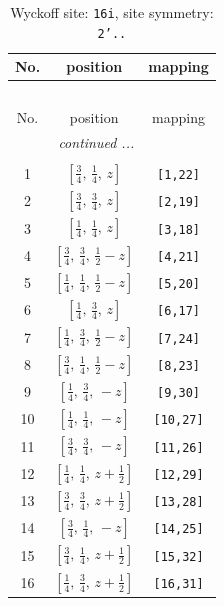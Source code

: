 \documentclass[fleqn,8pt]{jsarticle}
\begin{document}
\begin{longtable}{ccc}
\caption{Wyckoff site: {\tt 16i}, site symmetry: {\tt 2'..}}
 \\
 \hline \hline
No. & position & mapping \\ \hline \endfirsthead

\multicolumn{2}{l}{\tablename\ \thetable{}} \\
 \hline \hline
No. & position & mapping \\ \hline \endhead

 \hline \hline
\multicolumn{2}{r}{\footnotesize\it continued ...} \\ \endfoot

 \hline \hline
\multicolumn{2}{r}{} \\ \endlastfoot

1 & $\left[ \frac{3}{4},\, \frac{1}{4},\, z \right]$ & {\tt [1,22]} \\ \hline
2 & $\left[ \frac{3}{4},\, \frac{3}{4},\, z \right]$ & {\tt [2,19]} \\ \hline
3 & $\left[ \frac{1}{4},\, \frac{1}{4},\, z \right]$ & {\tt [3,18]} \\ \hline
4 & $\left[ \frac{3}{4},\, \frac{3}{4},\, \frac{1}{2} - z \right]$ & {\tt [4,21]} \\ \hline
5 & $\left[ \frac{1}{4},\, \frac{1}{4},\, \frac{1}{2} - z \right]$ & {\tt [5,20]} \\ \hline
6 & $\left[ \frac{1}{4},\, \frac{3}{4},\, z \right]$ & {\tt [6,17]} \\ \hline
7 & $\left[ \frac{1}{4},\, \frac{3}{4},\, \frac{1}{2} - z \right]$ & {\tt [7,24]} \\ \hline
8 & $\left[ \frac{3}{4},\, \frac{1}{4},\, \frac{1}{2} - z \right]$ & {\tt [8,23]} \\ \hline
9 & $\left[ \frac{1}{4},\, \frac{3}{4},\, - z \right]$ & {\tt [9,30]} \\ \hline
10 & $\left[ \frac{1}{4},\, \frac{1}{4},\, - z \right]$ & {\tt [10,27]} \\ \hline
11 & $\left[ \frac{3}{4},\, \frac{3}{4},\, - z \right]$ & {\tt [11,26]} \\ \hline
12 & $\left[ \frac{1}{4},\, \frac{1}{4},\, z + \frac{1}{2} \right]$ & {\tt [12,29]} \\ \hline
13 & $\left[ \frac{3}{4},\, \frac{3}{4},\, z + \frac{1}{2} \right]$ & {\tt [13,28]} \\ \hline
14 & $\left[ \frac{3}{4},\, \frac{1}{4},\, - z \right]$ & {\tt [14,25]} \\ \hline
15 & $\left[ \frac{3}{4},\, \frac{1}{4},\, z + \frac{1}{2} \right]$ & {\tt [15,32]} \\ \hline
16 & $\left[ \frac{1}{4},\, \frac{3}{4},\, z + \frac{1}{2} \right]$ & {\tt [16,31]} \\
\end{longtable}
\end{document}

